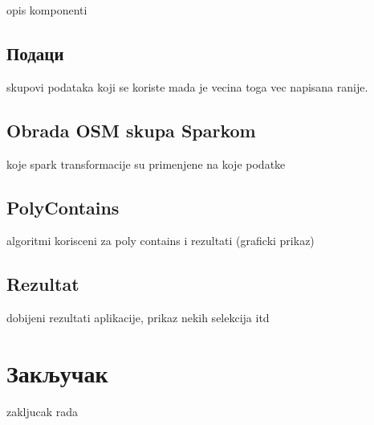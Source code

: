 \documentclass[12pt,oneside]{memoir}
\begin{document}
opis komponenti

\section{Подаци}
\label{sec:osm_spark_podaci}

skupovi podataka koji se koriste mada je vecina toga vec napisana ranije.

\section{Obrada OSM skupa Sparkom}
\label{sec:osm_spark_obrada}

koje spark transformacije su primenjene na koje podatke

\section{PolyContains}
\label{sec:poly_cont}

algoritmi korisceni za poly contains i rezultati (graficki prikaz)

\section{Rezultat}
\label{sec:rezultat}

dobijeni rezultati aplikacije, prikaz nekih selekcija itd

\chapter{Закључак}
\label{chp:zakljucak}

zakljucak rada


\literatura

\backmatter
\end{document}
